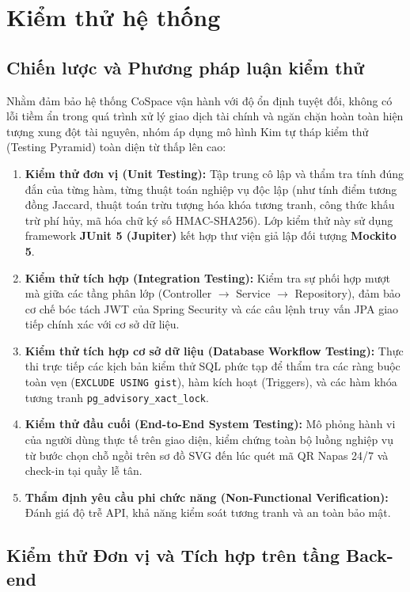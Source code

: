 \section{Kiểm thử hệ thống}

\subsection{Chiến lược và Phương pháp luận kiểm thử}

Nhằm đảm bảo hệ thống CoSpace vận hành với độ ổn định tuyệt đối, không có lỗi tiềm ẩn trong quá trình xử lý giao dịch tài chính và ngăn chặn hoàn toàn hiện tượng xung đột tài nguyên, nhóm áp dụng mô hình Kim tự tháp kiểm thử (Testing Pyramid) toàn diện từ thấp lên cao:

\begin{enumerate}
    \item \textbf{Kiểm thử đơn vị (Unit Testing):} Tập trung cô lập và thẩm tra tính đúng đắn của từng hàm, từng thuật toán nghiệp vụ độc lập (như tính điểm tương đồng Jaccard, thuật toán trừu tượng hóa khóa tương tranh, công thức khấu trừ phí hủy, mã hóa chữ ký số HMAC-SHA256). Lớp kiểm thử này sử dụng framework \textbf{JUnit 5 (Jupiter)} kết hợp thư viện giả lập đối tượng \textbf{Mockito 5}.
    \item \textbf{Kiểm thử tích hợp (Integration Testing):} Kiểm tra sự phối hợp mượt mà giữa các tầng phân lớp (Controller $\rightarrow$ Service $\rightarrow$ Repository), đảm bảo cơ chế bóc tách JWT của Spring Security và các câu lệnh truy vấn JPA giao tiếp chính xác với cơ sở dữ liệu.
    \item \textbf{Kiểm thử tích hợp cơ sở dữ liệu (Database Workflow Testing):} Thực thi trực tiếp các kịch bản kiểm thử SQL phức tạp để thẩm tra các ràng buộc toàn vẹn (\texttt{EXCLUDE USING gist}), hàm kích hoạt (Triggers), và các hàm khóa tương tranh \texttt{pg\_advisory\_xact\_lock}.
    \item \textbf{Kiểm thử đầu cuối (End-to-End System Testing):} Mô phỏng hành vi của người dùng thực tế trên giao diện, kiểm chứng toàn bộ luồng nghiệp vụ từ bước chọn chỗ ngồi trên sơ đồ SVG đến lúc quét mã QR Napas 24/7 và check-in tại quầy lễ tân.
    \item \textbf{Thẩm định yêu cầu phi chức năng (Non-Functional Verification):} Đánh giá độ trễ API, khả năng kiểm soát tương tranh và an toàn bảo mật.
\end{enumerate}

\subsection{Kiểm thử Đơn vị và Tích hợp trên tầng Back-end}

